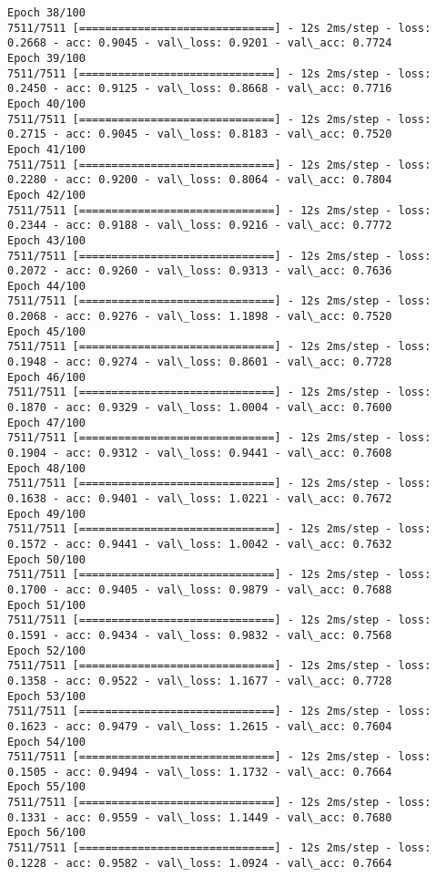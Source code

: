 \documentclass[11pt]{article}
\begin{document}
\begin{Verbatim}[commandchars=\\\{\}]
Epoch 38/100
7511/7511 [==============================] - 12s 2ms/step - loss: 0.2668 - acc: 0.9045 - val\_loss: 0.9201 - val\_acc: 0.7724
Epoch 39/100
7511/7511 [==============================] - 12s 2ms/step - loss: 0.2450 - acc: 0.9125 - val\_loss: 0.8668 - val\_acc: 0.7716
Epoch 40/100
7511/7511 [==============================] - 12s 2ms/step - loss: 0.2715 - acc: 0.9045 - val\_loss: 0.8183 - val\_acc: 0.7520
Epoch 41/100
7511/7511 [==============================] - 12s 2ms/step - loss: 0.2280 - acc: 0.9200 - val\_loss: 0.8064 - val\_acc: 0.7804
Epoch 42/100
7511/7511 [==============================] - 12s 2ms/step - loss: 0.2344 - acc: 0.9188 - val\_loss: 0.9216 - val\_acc: 0.7772
Epoch 43/100
7511/7511 [==============================] - 12s 2ms/step - loss: 0.2072 - acc: 0.9260 - val\_loss: 0.9313 - val\_acc: 0.7636
Epoch 44/100
7511/7511 [==============================] - 12s 2ms/step - loss: 0.2068 - acc: 0.9276 - val\_loss: 1.1898 - val\_acc: 0.7520
Epoch 45/100
7511/7511 [==============================] - 12s 2ms/step - loss: 0.1948 - acc: 0.9274 - val\_loss: 0.8601 - val\_acc: 0.7728
Epoch 46/100
7511/7511 [==============================] - 12s 2ms/step - loss: 0.1870 - acc: 0.9329 - val\_loss: 1.0004 - val\_acc: 0.7600
Epoch 47/100
7511/7511 [==============================] - 12s 2ms/step - loss: 0.1904 - acc: 0.9312 - val\_loss: 0.9441 - val\_acc: 0.7608
Epoch 48/100
7511/7511 [==============================] - 12s 2ms/step - loss: 0.1638 - acc: 0.9401 - val\_loss: 1.0221 - val\_acc: 0.7672
Epoch 49/100
7511/7511 [==============================] - 12s 2ms/step - loss: 0.1572 - acc: 0.9441 - val\_loss: 1.0042 - val\_acc: 0.7632
Epoch 50/100
7511/7511 [==============================] - 12s 2ms/step - loss: 0.1700 - acc: 0.9405 - val\_loss: 0.9879 - val\_acc: 0.7688
Epoch 51/100
7511/7511 [==============================] - 12s 2ms/step - loss: 0.1591 - acc: 0.9434 - val\_loss: 0.9832 - val\_acc: 0.7568
Epoch 52/100
7511/7511 [==============================] - 12s 2ms/step - loss: 0.1358 - acc: 0.9522 - val\_loss: 1.1677 - val\_acc: 0.7728
Epoch 53/100
7511/7511 [==============================] - 12s 2ms/step - loss: 0.1623 - acc: 0.9479 - val\_loss: 1.2615 - val\_acc: 0.7604
Epoch 54/100
7511/7511 [==============================] - 12s 2ms/step - loss: 0.1505 - acc: 0.9494 - val\_loss: 1.1732 - val\_acc: 0.7664
Epoch 55/100
7511/7511 [==============================] - 12s 2ms/step - loss: 0.1331 - acc: 0.9559 - val\_loss: 1.1449 - val\_acc: 0.7680
Epoch 56/100
7511/7511 [==============================] - 12s 2ms/step - loss: 0.1228 - acc: 0.9582 - val\_loss: 1.0924 - val\_acc: 0.7664

\end{Verbatim}
\end{document}
